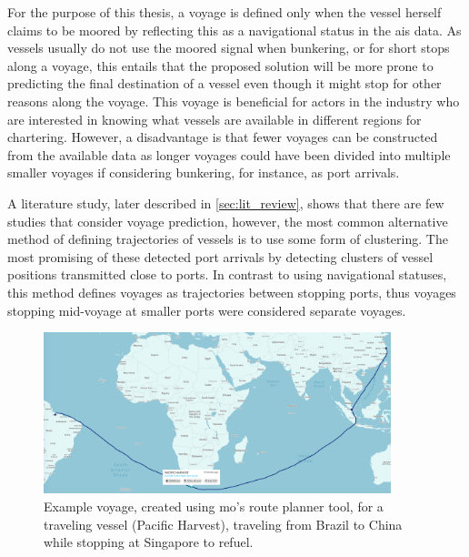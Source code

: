 For the purpose of this thesis, a voyage is defined only when the vessel herself claims to be moored by reflecting this as a navigational status in the \acrfull{ais} data. As vessels usually do not use the moored signal when bunkering, or for short stops along a voyage, this entails that the proposed solution will be more prone to predicting the final destination of a vessel even though it might stop for other reasons along the voyage. This voyage is beneficial for actors in the industry who are interested in knowing what vessels are available in different regions for chartering. However, a disadvantage is that fewer voyages can be constructed from the available data as longer voyages could have been divided into multiple smaller voyages if considering bunkering, for instance, as port arrivals.

A literature study, later described in \cref{sec:lit_review}, shows that there are few studies that consider voyage prediction, however, the most common alternative method of defining trajectories of vessels is to use some form of clustering. The most promising of these detected port arrivals by detecting clusters of vessel positions transmitted close to ports. In contrast to using navigational statuses, this method defines voyages as trajectories between stopping ports, thus voyages stopping mid-voyage at smaller ports were considered separate voyages.

\begin{figure}[htbp]  %
    \centering
    \includegraphics[width=0.9\textwidth]{figures/mo_voyage}
    \caption{Example voyage, created using \acrshort{mo}'s route planner tool, for a traveling vessel (Pacific Harvest), traveling from Brazil to China while stopping at Singapore to refuel.}
    \label{fig:example_voyage}
\end{figure}

